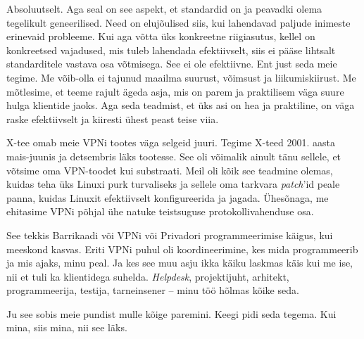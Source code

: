 
Absoluutselt. Aga seal on see aspekt, et standardid on ja peavadki olema 
tegelikult geneerilised. Need on elujõulised siis, kui lahendavad 
paljude inimeste erinevaid probleeme. Kui aga võtta üks konkreetne riigiasutus, kellel on konkreetsed vajadused, mis tuleb 
lahendada efektiivselt, siis ei pääse lihtsalt 
standarditele vastava osa võtmisega. See ei ole efektiivne. Ent
just seda meie tegime. Me 
võib-olla ei tajunud maailma suurust, võimsust ja liikumiskiirust. 
Me mõtlesime, et teeme rajult 
ägeda asja, mis on parem ja praktilisem väga suure 
hulga klientide jaoks. Aga seda teadmist, et üks asi on hea ja praktiline,  
on väga raske efektiivselt ja kiiresti ühest peast teise viia.  


X-tee omab meie VPNi tootes väga selgeid 
juuri. Tegime X-teed 2001. aasta mais-juunis ja detsembris läks tootesse. 
See oli võimalik ainult tänu sellele, et võtsime oma VPN-toodet kui 
substraati. Meil oli kõik see teadmine olemas, kuidas teha üks Linuxi purk 
turvaliseks ja sellele oma tarkvara 
\emph{patch}'id peale panna, kuidas Linuxit efektiivselt konfigureerida ja jagada. Ühesõnaga, me ehitasime VPNi põhjal ühe natuke teistsuguse 
protokollivahenduse osa. 


See tekkis Barrikaadi või VPNi või Privadori 
programmeerimise käigus, kui meeskond kasvas. Eriti VPNi puhul oli
koordineerimine, kes mida programmeerib ja mis ajaks, minu peal. Ja kes see muu asju ikka käiku laskmas käis kui me 
ise, nii et tuli ka klientidega suhelda. \emph{Helpdesk}, 
projektijuht, arhitekt, programmeerija, testija, tarneinsener – minu töö hõlmas kõike seda. 


Ju see sobis meie pundist mulle kõige paremini. Keegi pidi seda tegema. Kui mina, siis mina, nii see läks.


